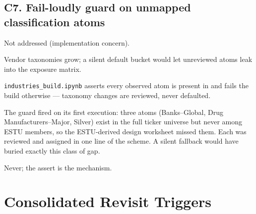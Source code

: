 \documentclass[11pt,a4paper]{article}
\begin{document}
\subsection{C7. Fail-loudly guard on unmapped classification atoms}

\begin{description}[style=nextline]
  \item[USE4] Not addressed (implementation concern).
  \item[Deviation] Vendor taxonomies grow; a silent default bucket would let
    unreviewed atoms leak into the exposure matrix.
  \item[Solution] \texttt{industries\_build.ipynb} asserts every observed atom
    is present in  and fails the build otherwise ---
    taxonomy changes are reviewed, never defaulted.
  \item[Validity] The guard fired on its first execution: three atoms
    (Banks--Global, Drug Manufacturers--Major, Silver) exist in the full ticker
    universe but never among ESTU members, so the ESTU-derived design worksheet
    missed them. Each was reviewed and assigned in one line of the scheme. A
    silent fallback would have buried exactly this class of gap.
  \item[Revisit when] Never; the assert is the mechanism.
\end{description}

\section{Consolidated Revisit Triggers}
\end{document}
